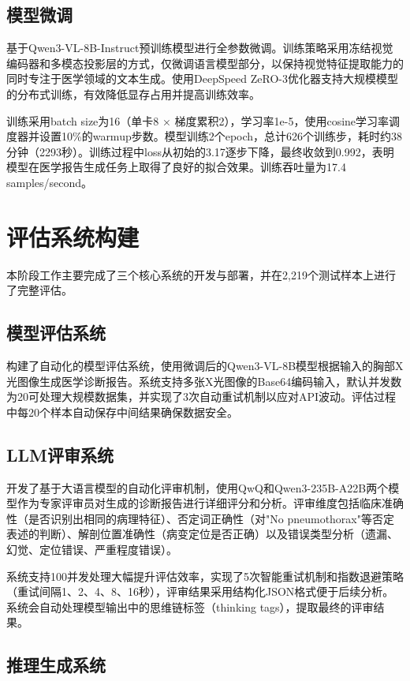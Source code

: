 \documentclass[12pt,a4paper]{article}
\begin{document}
\subsection{模型微调}

基于Qwen3-VL-8B-Instruct预训练模型进行全参数微调。训练策略采用冻结视觉编码器和多模态投影层的方式，仅微调语言模型部分，以保持视觉特征提取能力的同时专注于医学领域的文本生成。使用DeepSpeed ZeRO-3优化器支持大规模模型的分布式训练，有效降低显存占用并提高训练效率。

训练采用batch size为16（单卡8 × 梯度累积2），学习率1e-5，使用cosine学习率调度器并设置10\%的warmup步数。模型训练2个epoch，总计626个训练步，耗时约38分钟（2293秒）。训练过程中loss从初始的3.17逐步下降，最终收敛到0.992，表明模型在医学报告生成任务上取得了良好的拟合效果。训练吞吐量为17.4 samples/second。

\section{评估系统构建}

本阶段工作主要完成了三个核心系统的开发与部署，并在2,219个测试样本上进行了完整评估。

\subsection{模型评估系统}

构建了自动化的模型评估系统，使用微调后的Qwen3-VL-8B模型根据输入的胸部X光图像生成医学诊断报告。系统支持多张X光图像的Base64编码输入，默认并发数为20可处理大规模数据集，并实现了3次自动重试机制以应对API波动。评估过程中每20个样本自动保存中间结果确保数据安全。

\subsection{LLM评审系统}

开发了基于大语言模型的自动化评审机制，使用QwQ和Qwen3-235B-A22B两个模型作为专家评审员对生成的诊断报告进行详细评分和分析。评审维度包括临床准确性（是否识别出相同的病理特征）、否定词正确性（对"No pneumothorax"等否定表述的判断）、解剖位置准确性（病变定位是否正确）以及错误类型分析（遗漏、幻觉、定位错误、严重程度错误）。

系统支持100并发处理大幅提升评估效率，实现了5次智能重试机制和指数退避策略（重试间隔1、2、4、8、16秒），评审结果采用结构化JSON格式便于后续分析。系统会自动处理模型输出中的思维链标签（thinking tags），提取最终的评审结果。

\subsection{推理生成系统}
\end{document}
